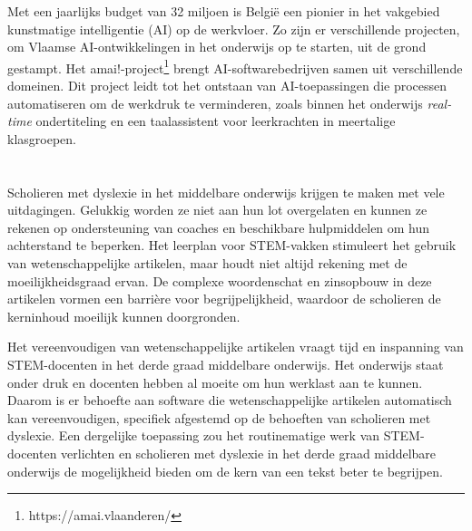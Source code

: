 Met een jaarlijks budget van 32 miljoen is België een pionier \autocite{Crevits2022} in het vakgebied kunstmatige intelligentie (AI) op de werkvloer.  Zo zijn er verschillende projecten, om Vlaamse AI-ontwikkelingen in het onderwijs op te starten, uit de grond gestampt. Het amai!-project\footnote{https://amai.vlaanderen/}  brengt AI-softwarebedrijven samen uit verschillende domeinen. Dit project leidt tot het ontstaan van AI-toepassingen die processen automatiseren om de werkdruk te verminderen, zoals binnen het onderwijs \textit{real-time} ondertiteling en een taalassistent voor leerkrachten in meertalige klasgroepen.

\section{}%
\label{sec:probleemstelling}


Scholieren met dyslexie in het middelbare onderwijs krijgen te maken met vele uitdagingen. Gelukkig worden ze niet aan hun lot overgelaten en kunnen ze rekenen op ondersteuning van coaches en beschikbare hulpmiddelen om hun achterstand te beperken. Het leerplan voor STEM-vakken stimuleert het gebruik van wetenschappelijke artikelen, maar houdt niet altijd rekening met de moeilijkheidsgraad ervan. De complexe woordenschat en zinsopbouw in deze artikelen vormen een barrière voor begrijpelijkheid, waardoor de scholieren de kerninhoud moeilijk kunnen doorgronden.

Het vereenvoudigen van wetenschappelijke artikelen vraagt tijd en inspanning van STEM-docenten in het derde graad middelbare onderwijs. Het onderwijs staat onder druk en docenten hebben al moeite om hun werklast aan te kunnen. Daarom is er behoefte aan software die wetenschappelijke artikelen automatisch kan vereenvoudigen, specifiek afgestemd op de behoeften van scholieren met dyslexie. Een dergelijke toepassing zou het routinematige werk van STEM-docenten verlichten en scholieren met dyslexie in het derde graad middelbare onderwijs de mogelijkheid bieden om de kern van een tekst beter te begrijpen.


